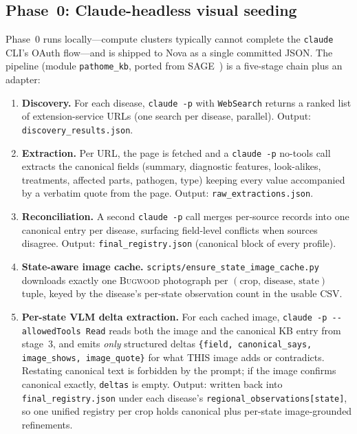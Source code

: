 \documentclass[11pt,twocolumn]{article}
\newcommand{\bugwood}{\textsc{Bugwood}\xspace}
\begin{document}
\subsection{Phase~0: Claude-headless visual seeding}
\label{sec:claudeseed}

Phase~0 runs locally---compute clusters typically
cannot complete the \texttt{claude} CLI's OAuth
flow---and is shipped to Nova as a single committed
JSON. The pipeline (module \texttt{pathome\_kb},
ported from SAGE~\citep{sage2025}) is a five-stage
chain plus an adapter:

\begin{enumerate}
  \item \textbf{Discovery.} For each disease,
    \texttt{claude -p} with \texttt{WebSearch} returns
    a ranked list of extension-service URLs (one search
    per disease, parallel). Output:
    \texttt{discovery\_results.json}.
  \item \textbf{Extraction.} Per URL, the page is
    fetched and a \texttt{claude -p} no-tools call
    extracts the canonical fields (summary, diagnostic
    features, look-alikes, treatments, affected parts,
    pathogen, type) keeping every value accompanied by
    a verbatim quote from the page. Output:
    \texttt{raw\_extractions.json}.
  \item \textbf{Reconciliation.} A second
    \texttt{claude -p} call merges per-source records
    into one canonical entry per disease, surfacing
    field-level conflicts when sources disagree.
    Output: \texttt{final\_registry.json} (canonical
    block of every profile).
  \item \textbf{State-aware image cache.}
    \texttt{scripts/ensure\_state\_image\_cache.py}
    downloads exactly one \bugwood photograph per
    $(\text{crop},\,\text{disease},\,\text{state})$
    tuple, keyed by the disease's per-state observation
    count in the usable CSV.
  \item \textbf{Per-state VLM delta extraction.} For
    each cached image, \texttt{claude -p
    -{}-allowedTools Read} reads both the image and
    the canonical KB entry from stage~3, and emits
    \emph{only} structured deltas
    \texttt{\{field, canonical\_says, image\_shows,
    image\_quote\}} for what THIS image adds or
    contradicts. Restating canonical text is forbidden
    by the prompt; if the image confirms canonical
    exactly, \texttt{deltas} is empty. Output: written
    back into \texttt{final\_registry.json} under each
    disease's \texttt{regional\_observations[state]},
    so one unified registry per crop holds canonical
    plus per-state image-grounded refinements.
\end{enumerate}
\end{document}
